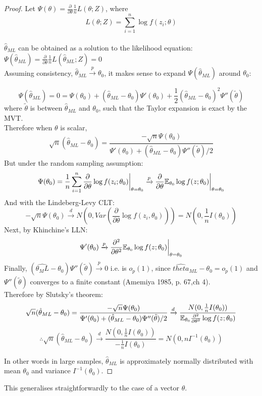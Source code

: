 \documentclass[DIV=14,titlepage=false]{scrreprt}
\begin{document}
\begin{proof}
Let \(\Psi(\theta)=\frac{\partial}{\partial\theta}\frac{1}{n}L (\theta;Z)\), where
\[L(\theta;Z)=\sum_{i=1}^n\log f(z_i;\theta)\]
\\\(\hat{\theta}_{ML}\) can be obtained as a solution to the likelihood equation: \(\Psi(\hat{\theta}_{ML})=\frac{\partial}{\partial\theta}\frac{1}{n}L (\hat\theta_{ML};Z)=0\)
\\ Assuming consistency, \(\hat{\theta}_{ML}\xrightarrow{p}\theta_0\), it makes sense to expand \(\Psi(\hat{\theta}_{ML})\) around \(\theta_0\):

\[\Psi(\hat{\theta}_{ML})=0=\Psi(\theta_0)+(\hat{\theta}_{ML}-\theta_0)\Psi'(\theta_0)+\frac{1}{2}(\hat{\theta}_{ML}-\theta_0)^2\Psi''(\tilde{\theta})\]
where \(\tilde{\theta}\) is between \(\hat{\theta}_{ML}\) and \(\theta_0\), such that the Taylor expansion is exact by the MVT.
\\Therefore when \(\theta\) is scalar,
\[\sqrt{n}(\hat{\theta}_{ML}-\theta_0)=\frac{-\sqrt{n}\Psi(\theta_0)}{\Psi'(\theta_0)+(\hat{\theta}_{ML}-\theta_0)\Psi''(\tilde{\theta})/2}\]
But under the random sampling assumption:
\[\Psi(\theta_0)=\frac{1}{n}\sum_{i=1}^n\frac{\partial}{\partial\theta}\log f(z_i;\theta_0)\bigg|_{\theta=\theta_0}\xrightarrow{p}\frac{\partial}{\partial\theta}\mathbb{E}_{\theta_0}\log f(z;\theta_0)\bigg|_{\theta=\theta_0}\]
And with the Lindeberg-Levy CLT:
\[-\sqrt{n}\Psi(\theta_0)\xrightarrow{d}N\left(0,Var\left(\frac{\partial}{\partial\theta}\log f(z_i,\theta_0)\right)\right)=N\left(0,\frac{1}{n}I(\theta_0)\right)\]
Next, by Khinchine's LLN:
\[\Psi'(\theta_0)\xrightarrow{p}\frac{\partial^2}{\partial\theta^2}\mathbb{E}_{\theta_0}\log f(z;\theta_0)\bigg|_{\theta=\theta_0}\]
Finally, \((\hat{\theta_ML}-\theta_0)\Psi''(\tilde{\theta})\xrightarrow{p}0\) i.e. is \(o_p(1)\), since \(\hat{theta}_{ML}-\theta_0 = o_p(1)\) and \(\Psi''(\tilde{\theta})\) converges to a finite constant (Amemiya 1985, p. 67,ch 4).
\\ Therefore by Slutsky's theorem:
\[\sqrt{n}(\hat{\theta}_{ML}-\theta_0)=\frac{-\sqrt{n}\Psi(\theta_0)}{\Psi'(\theta_0)+(\hat{\theta}_{ML}-\theta_0)\Psi''(\tilde{\theta})/2}\xrightarrow{d}\frac{N(0,\frac{1}{n}I(\theta_0))}{\mathbb{E}_{\theta_0}\frac{\partial^2}{\partial\theta^2}\log f(z;\theta_0)}\]
\[\therefore \sqrt{n}(\hat{\theta}_{ML}-\theta_0)\xrightarrow{d}\frac{N(0,\frac{1}{n}I(\theta_0))}{-\frac{1}{n}I(\theta_0)}=N(0,nI^{-1}(\theta_0))\]

In other words in large samples, \(\hat{\theta}_{ML}\) is approximately normally distributed with mean \(\theta_0\) and variance \(I^{-1}(\theta_0)\). 
\end{proof}
This generalises straightforwardly to the case of a vector \(\theta\).
\end{document}
